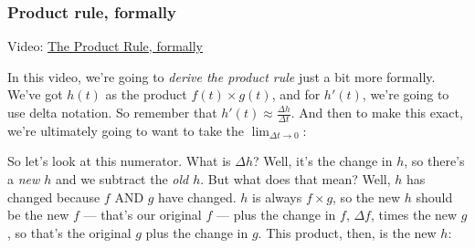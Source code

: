 \documentclass[pdftex, brazil, 12pt, twoside]{article}
\begin{document}
\subsubsection{Product rule, formally}
\label{u2-product-rule-formally}

Video: \href{https://www.youtube.com/watch?v=DWTj6C6PKL0}{The Product Rule, formally}

In this video, we're going to \emph{derive the product
rule} just a bit more formally.
We've got $h(t)$ as the product $f(t) \times g(t)$,
and for $h'(t)$, we're going to use delta notation.
So remember that $\displaystyle h'(t) \approx \frac{\Delta h}{\Delta t}$.
And then to make this exact, we're
ultimately going to want to take the $\lim_{\Delta t \to 0}$:

\begin{figure}[H]
  \begin{center}
  \end{center}
\end{figure}

So let's look at this numerator.
What is $\Delta h$?
Well, it's the change in $h$, so there's a \emph{new $h$}
and we subtract the \emph{old $h$}.
But what does that mean?
Well, $h$ has changed because $f$ AND $g$ have changed.
$h$ is always $f \times g$, so the new $h$ should
be the new $f$ --- that's our original $f$ ---
plus the change in $f$, $\Delta f$, times the new $g$,
so that's the original $g$ plus the change in $g$.
This product, then, is the new $h$:

\begin{figure}[H]
  \begin{center}
  \end{center}
\end{figure}
\end{document}
